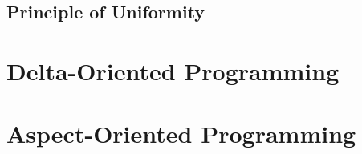 \subsection{Principle of Uniformity}
% 

%

\lessonslearned{
	\item \ldots
}{
	\item \ldots
}{
	\ldots
}

\sectionend

\section{Delta-Oriented Programming}



\lessonslearned{
	\item \ldots
}{
	\item \ldots
}{
	\ldots
}

\sectionend

\section{Aspect-Oriented Programming}



\lessonslearned{
	\item \ldots
}{
	\item \ldots
}{
	\ldots
}




